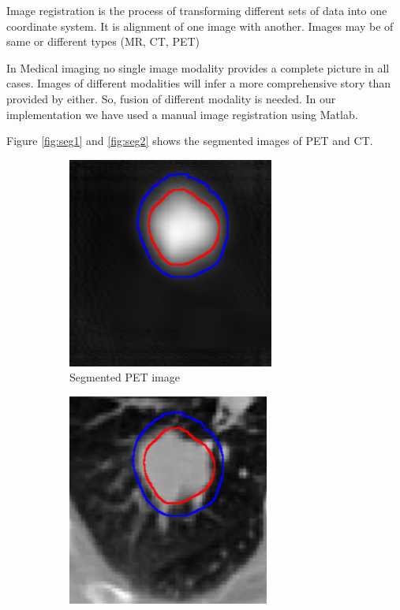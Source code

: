 Image registration is the process of transforming different sets of data into one coordinate system.   It is alignment of one image
 with another. Images may be of same or different types (MR, CT, PET)

 
 In Medical imaging no single image modality provides a complete picture in all cases. Images of different modalities will infer a more comprehensive story than provided by either. So,  fusion of different modality is needed. In our implementation we have used a manual image registration using Matlab. 
 
 
 Figure \ref{fig:seg1} and \ref{fig:seg2} shows the segmented images of PET and CT.
 

 
\begin{figure}[h]
	\centering
	\begin{subfigure}{.5\textwidth}
		\centering
		\includegraphics[width=.8\linewidth]{fig/pet1_marked}
		\caption{Segmented PET image}
		\label{fig:sub1}
	\end{subfigure}%
	\begin{subfigure}{.5\textwidth}
		\centering
		\includegraphics[width=.8\linewidth]{fig/ct1_marked}

\end{subfigure}
\end{figure}
